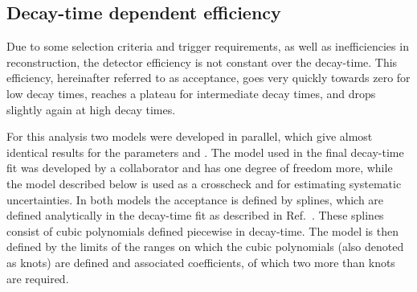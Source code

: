 \subsection{Decay-time dependent efficiency}
\label{sec:acceptance}

Due to some selection criteria and trigger requirements, as well as inefficiencies in \velo reconstruction, the detector efficiency is not constant over the \Bz decay-time.
This efficiency, hereinafter referred to as acceptance, goes very quickly towards zero for low decay times, reaches a plateau for intermediate decay times, and drops slightly again at high decay times.

For this analysis two models were developed in parallel, which give almost identical results for the \CP parameters \Sf and \Sfbar.
The model used in the final decay-time fit was developed by a collaborator and has one degree of freedom more, while the model described below is used as a crosscheck and for estimating systematic uncertainties.
In both models the acceptance is defined by splines, which are defined analytically in the decay-time fit as described in Ref.~\cite{Karbach:2014qba}.
These splines consist of cubic polynomials defined piecewise in decay-time.
The model is then defined by the limits of the ranges on which the cubic polynomials (also denoted as knots) are defined and associated coefficients, of which two more than knots are required.

